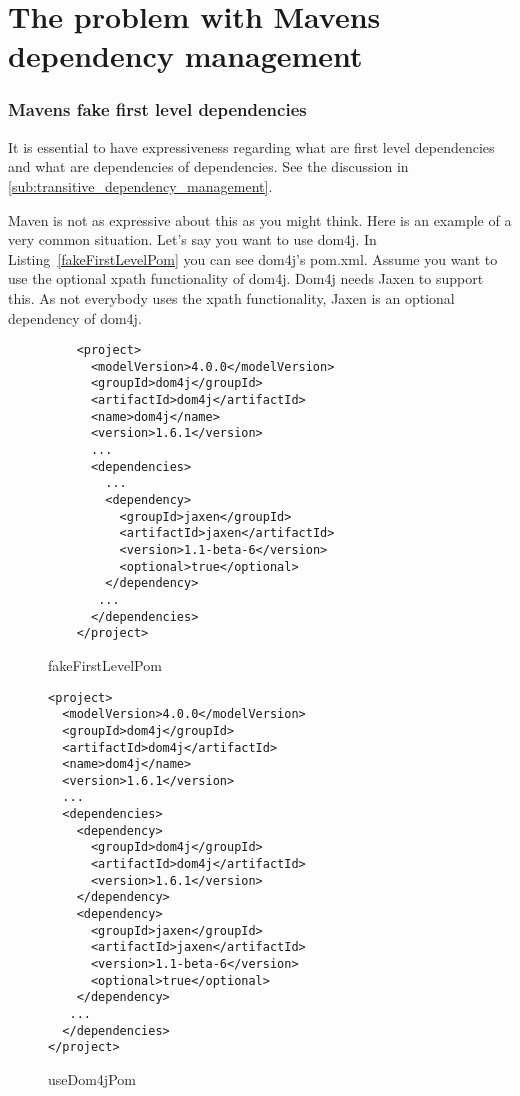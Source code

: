 \chapter{The problem with Mavens dependency management} %
\label{cha:the_problem_with_mavens_dependency_management}

\subsection{Mavens fake first level dependencies} %
\label{sub:mavens_fake_first_level_dependencies}

It is essential to have expressiveness regarding what are first level dependencies and what are dependencies of dependencies. See the discussion in \ref{sub:transitive_dependency_management}.

Maven is not as expressive about this as you might think. Here is an example of a very common situation. Let's say you want to use dom4j. In Listing~\ref{fakeFirstLevelPom} you can see dom4j's pom.xml. Assume you want to use the optional xpath functionality of dom4j. Dom4j needs Jaxen to support this. As not everybody uses the xpath functionality, Jaxen is an optional dependency of dom4j. 

\begin{figure}
	\caption{fakeFirstLevelPom}
	\begin{Verbatim}
	<project>
	  <modelVersion>4.0.0</modelVersion>
	  <groupId>dom4j</groupId>
	  <artifactId>dom4j</artifactId>
	  <name>dom4j</name>
	  <version>1.6.1</version>
	  ...
	  <dependencies>
	    ...
	    <dependency>
	      <groupId>jaxen</groupId>
	      <artifactId>jaxen</artifactId>
	      <version>1.1-beta-6</version>
	      <optional>true</optional>
	    </dependency>
	   ...
	  </dependencies>
	</project>	
	\end{Verbatim}	
\end{figure}

\begin{figure}
	\caption{useDom4jPom}
	\begin{Verbatim}
<project>
  <modelVersion>4.0.0</modelVersion>
  <groupId>dom4j</groupId>
  <artifactId>dom4j</artifactId>
  <name>dom4j</name>
  <version>1.6.1</version>
  ...
  <dependencies>
    <dependency>
      <groupId>dom4j</groupId>
	  <artifactId>dom4j</artifactId>
	  <version>1.6.1</version>
    </dependency>
    <dependency>
      <groupId>jaxen</groupId>
      <artifactId>jaxen</artifactId>
      <version>1.1-beta-6</version>
      <optional>true</optional>
    </dependency>
   ...
  </dependencies>
</project>	
	\end{Verbatim}	
\end{figure}


